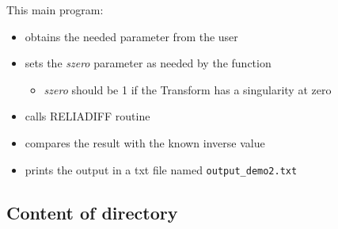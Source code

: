\documentclass[10pt]{article}
\begin{document}
This main program:
\begin{itemize}
    \item obtains the needed parameter from the user
    \item sets the \emph{szero} parameter as needed by the function
	    \begin{itemize}
	      \item \emph{szero} should be 1 if the Transform has a singularity at zero
	    \end{itemize}
    \item calls RELIADIFF routine
    \item compares the result with the known inverse value
    \item prints the output in a txt file named {\tt output\_demo2.txt}

\end{itemize}

\subsection{Content of directory}
\end{document}
